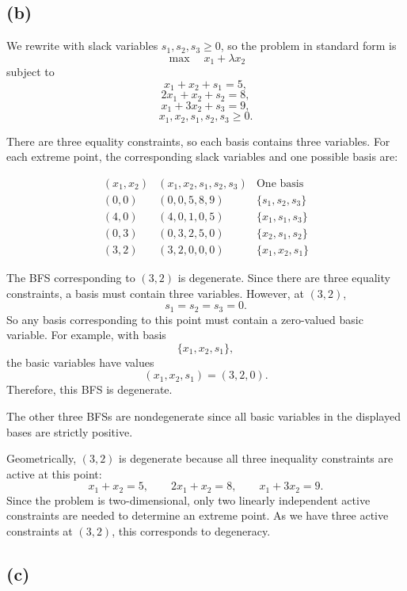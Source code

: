 \documentclass{article}
\begin{document}
\vspace{5mm}
\subsection*{(b)}


We rewrite with slack variables $s_1,s_2,s_3 \geq 0$, so the problem in
standard form is
\[
\max \quad x_1+\lambda x_2
\]
subject to
\[
x_1+x_2+s_1=5,
\]
\[
2x_1+x_2+s_2=8,
\]
\[
x_1+3x_2+s_3=9,
\]
\[
x_1,x_2,s_1,s_2,s_3\geq 0.
\]

There are three equality constraints, so each basis contains three
variables. For each extreme point, the corresponding slack variables
and one possible basis are:

\[
\begin{array}{c|c|c}
(x_1,x_2) &
(x_1,x_2,s_1,s_2,s_3) &
\text{One basis} \\
\hline
(0,0) & (0,0,5,8,9) & \{s_1,s_2,s_3\} \\
(4,0) & (4,0,1,0,5) & \{x_1,s_1,s_3\} \\
(0,3) & (0,3,2,5,0) & \{x_2,s_1,s_2\} \\
(3,2) & (3,2,0,0,0) & \{x_1,x_2,s_1\}
\end{array}
\]

The BFS corresponding to $(3,2)$ is degenerate. Since there are
three equality constraints, a basis must contain three variables.
However, at $(3,2)$,
\[
s_1=s_2=s_3=0.
\]
So any basis corresponding to this point must contain a
zero-valued basic variable. For example, with basis
\[
\{x_1,x_2,s_1\},
\]
the basic variables have values
\[
(x_1,x_2,s_1)=(3,2,0).
\]
Therefore, this BFS is degenerate.

The other three BFSs are nondegenerate since all basic variables in
the displayed bases are strictly positive.

Geometrically, $(3,2)$ is degenerate because all three inequality
constraints are active at this point:
\[
x_1+x_2=5,\qquad
2x_1+x_2=8,\qquad
x_1+3x_2=9.
\]
Since the problem is two-dimensional, only two linearly independent
active constraints are needed to determine an extreme point. As we have
three active constraints at $(3,2)$, this corresponds to degeneracy.





\vspace{5mm}

\subsection*{(c)}
\end{document}
